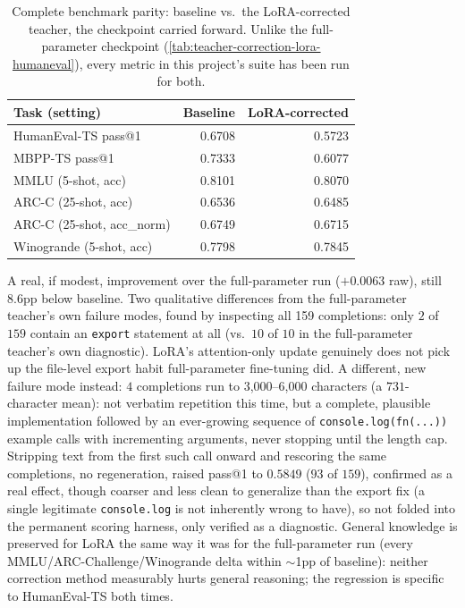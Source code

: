 \documentclass{article}
\theoremstyle{plain}
\theoremstyle{definition}
\theoremstyle{remark}
\begin{document}
\begin{table}[t]
\centering
\scriptsize
\setlength{\tabcolsep}{3pt}
\begin{tabular}{lrr}
\toprule
Task (setting) & Baseline & LoRA-corrected \\
\midrule
HumanEval-TS pass@1 & 0.6708 & 0.5723 \\
MBPP-TS pass@1 & 0.7333 & 0.6077 \\
MMLU (5-shot, acc) & 0.8101 & 0.8070 \\
ARC-C (25-shot, acc) & 0.6536 & 0.6485 \\
ARC-C (25-shot, acc\_norm) & 0.6749 & 0.6715 \\
Winogrande (5-shot, acc) & 0.7798 & 0.7845 \\
\bottomrule
\end{tabular}
\caption{Complete benchmark parity: baseline vs.\ the LoRA-corrected
teacher, the checkpoint carried forward. Unlike the full-parameter
checkpoint (\cref{tab:teacher-correction-lora-humaneval}), every metric
in this project's suite has been run for both.}
\label{tab:teacher-correction-lora-full-suite}
\end{table}

A real, if modest, improvement over the full-parameter run
($+0.0063$ raw), still $8.6$pp below baseline. Two qualitative
differences from the full-parameter teacher's own failure modes, found
by inspecting all 159 completions: only $2$ of $159$ contain an
\texttt{export} statement at all (vs.\ $10$ of $10$ in the
full-parameter teacher's own diagnostic). LoRA's attention-only update
genuinely does not pick up the file-level export habit full-parameter
fine-tuning did. A different, new failure mode instead: $4$ completions
run to $3$,$000$--$6$,$000$ characters (a $731$-character mean): not
verbatim repetition this time, but a complete, plausible implementation
followed by an ever-growing sequence of \texttt{console.log(fn(...))}
example calls with incrementing arguments, never stopping until the
length cap. Stripping text from the first such call onward and
rescoring the same completions, no regeneration, raised pass@1 to
$0.5849$ ($93$ of $159$), confirmed as a real effect, though coarser
and less clean to generalize than the export fix (a single legitimate
\texttt{console.log} is not inherently wrong to have), so not folded into
the permanent scoring harness, only verified as a diagnostic. General
knowledge is preserved for LoRA the same way it was for the
full-parameter run (every MMLU/ARC-Challenge/Winogrande delta within
$\sim$1pp of baseline): neither correction method measurably hurts
general reasoning; the regression is specific to HumanEval-TS both
times.
\end{document}
